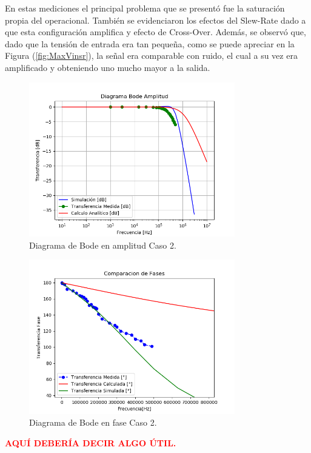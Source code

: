 En estas mediciones el principal problema que se presentó fue la saturación propia del operacional. También se evidenciaron los efectos del Slew-Rate dado a que esta configuración amplifica y efecto de Cross-Over. Además, se observó que, dado que la tensión de entrada era tan pequeña, como se puede apreciar en la Figura (\ref{fig:MaxVinsr}), la señal era comparable con ruido, el cual a su vez era amplificado y obteniendo uno mucho mayor a la salida.
\begin{figure}[H]	
	\centering
	\includegraphics[width=0.8\textwidth]{Ejercicio1/Imagenes/BodeC2.png}
	\caption{Diagrama de Bode en amplitud Caso 2.}
	\label{fig:BodeC2}
\end{figure} 
\begin{figure}[H]	
	\centering
	\includegraphics[width=0.8\textwidth]{Ejercicio1/Imagenes/BodephC2.png}
	\caption{Diagrama de Bode en fase Caso 2.}
	\label{fig:BodephC2}
\end{figure} 

\begin{center}
\textcolor{red}{\textbf{AQUÍ DEBERÍA DECIR ALGO ÚTIL.}}
\end{center}

